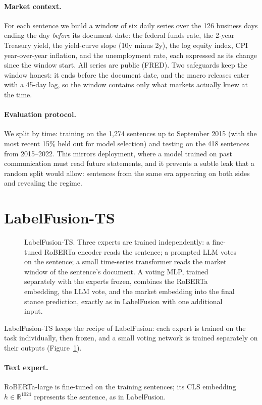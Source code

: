 \documentclass[11pt]{article}
\newcommand{\lfts}{LabelFusion\hbox{-}TS}
\newcommand{\lf}{LabelFusion}
\begin{document}
\paragraph{Market context.}
For each sentence we build a window of six daily series over the 126 business days ending the day \emph{before} its document date: the federal funds rate, the 2-year Treasury yield, the yield-curve slope (10y minus 2y), the log equity index, CPI year-over-year inflation, and the unemployment rate, each expressed as its change since the window start. All series are public (FRED). Two safeguards keep the window honest: it ends before the document date, and the macro releases enter with a 45-day lag, so the window contains only what markets actually knew at the time.

\paragraph{Evaluation protocol.}
We split by time: training on the 1{,}274 sentences up to September 2015 (with the most recent 15\% held out for model selection) and testing on the 418 sentences from 2015--2022. This mirrors deployment, where a model trained on past communication must read future statements, and it prevents a subtle leak that a random split would allow: sentences from the same era appearing on both sides and revealing the regime.


\section{\lfts{}}
\label{sec:model}

\begin{figure}[t]
  \centering
  \caption{\lfts{}. Three experts are trained independently: a fine-tuned RoBERTa encoder reads the sentence; a prompted LLM votes on the sentence; a small time-series transformer reads the market window of the sentence's document. A voting MLP, trained separately with the experts frozen, combines the RoBERTa embedding, the LLM vote, and the market embedding into the final stance prediction, exactly as in \lf{} with one additional input.}
  \label{fig:arch}
\end{figure}

\lfts{} keeps the recipe of \lf{}: each expert is trained on the task individually, then frozen, and a small voting network is trained separately on their outputs (Figure~\ref{fig:arch}).

\paragraph{Text expert.}
RoBERTa-large \citep{liu2019roberta} is fine-tuned on the training sentences; its CLS embedding $h \in \mathbb{R}^{1024}$ represents the sentence, as in \lf{}.
\end{document}
